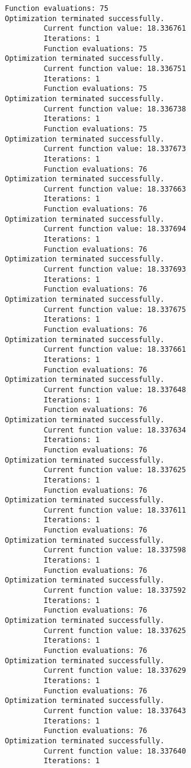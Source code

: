 \documentclass[11pt]{article}
\begin{document}
\begin{Verbatim}[commandchars=\\\{\}]
         Function evaluations: 75
Optimization terminated successfully.
         Current function value: 18.336761
         Iterations: 1
         Function evaluations: 75
Optimization terminated successfully.
         Current function value: 18.336751
         Iterations: 1
         Function evaluations: 75
Optimization terminated successfully.
         Current function value: 18.336738
         Iterations: 1
         Function evaluations: 75
Optimization terminated successfully.
         Current function value: 18.337673
         Iterations: 1
         Function evaluations: 76
Optimization terminated successfully.
         Current function value: 18.337663
         Iterations: 1
         Function evaluations: 76
Optimization terminated successfully.
         Current function value: 18.337694
         Iterations: 1
         Function evaluations: 76
Optimization terminated successfully.
         Current function value: 18.337693
         Iterations: 1
         Function evaluations: 76
Optimization terminated successfully.
         Current function value: 18.337675
         Iterations: 1
         Function evaluations: 76
Optimization terminated successfully.
         Current function value: 18.337661
         Iterations: 1
         Function evaluations: 76
Optimization terminated successfully.
         Current function value: 18.337648
         Iterations: 1
         Function evaluations: 76
Optimization terminated successfully.
         Current function value: 18.337634
         Iterations: 1
         Function evaluations: 76
Optimization terminated successfully.
         Current function value: 18.337625
         Iterations: 1
         Function evaluations: 76
Optimization terminated successfully.
         Current function value: 18.337611
         Iterations: 1
         Function evaluations: 76
Optimization terminated successfully.
         Current function value: 18.337598
         Iterations: 1
         Function evaluations: 76
Optimization terminated successfully.
         Current function value: 18.337592
         Iterations: 1
         Function evaluations: 76
Optimization terminated successfully.
         Current function value: 18.337625
         Iterations: 1
         Function evaluations: 76
Optimization terminated successfully.
         Current function value: 18.337629
         Iterations: 1
         Function evaluations: 76
Optimization terminated successfully.
         Current function value: 18.337643
         Iterations: 1
         Function evaluations: 76
Optimization terminated successfully.
         Current function value: 18.337640
         Iterations: 1

\end{Verbatim}
\end{document}
